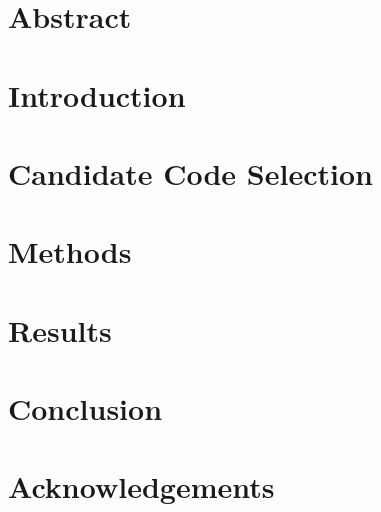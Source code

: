 





\section*{Abstract}\label{sec:abstract}


\section{Introduction}\label{sec:intro}


\section{Candidate Code Selection}\label{sec:codesel}


\section{Methods}\label{sec:methods}


\section{Results}\label{sec:results}


\section{Conclusion}\label{sec:conclusion}


\section{Acknowledgements}\label{sec:acknowledgments}



\printbibliography


